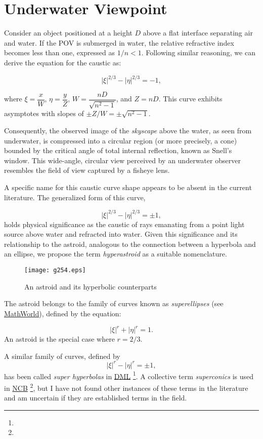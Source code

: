 \documentclass[twocolumn]{article}
\begin{document}
\section{Underwater Viewpoint}

Consider an object positioned at a height $D$ above a flat interface separating air and water. If the  POV is submerged in water, the relative refractive index becomes less than one, expressed as $1/n < 1$. Following similar reasoning, we can derive the equation for the caustic as:

$$ \left| \xi \right|^{2/3} - \left| \eta \right|^{2/3} = -1, $$

where $\xi = \dfrac{x}{W}$, $\eta = \dfrac{y}{Z}$, $W = \dfrac{nD}{\sqrt{n^2-1}}$, and $Z = nD$. This curve exhibits asymptotes with slopes of $\pm Z/W = \pm \sqrt{n^2-1}$.

Consequently, the observed image of the \emph{skyscape} above the water, as seen from underwater, is compressed into a circular region (or more precisely, a cone) bounded by the critical angle of total internal reflection, known as Snell's window. This wide-angle, circular view perceived by an underwater observer resembles the field of view captured by a fisheye lens.

A specific name for this caustic curve shape appears to be absent in the current literature. The generalized form of this curve,

$$ \left| \xi \right|^{2/3} - \left| \eta \right|^{2/3} = \pm1, $$
%
holds physical significance as the caustic of rays emanating from a point light source above water and refracted into water. Given this significance and its relationship to the astroid, analogous to the connection between a hyperbola and an ellipse, we propose the term \emph{hyperastroid} as a suitable nomenclature.

\begin{figure}[h]
	\centering
	\texttt{[image: g254.eps]}
	\caption{An astroid and its hyperbolic counterparts}
	\label{fig:caustic}
\end{figure}

The astroid belongs to the family of curves known as \emph{superellipses} (see \href{https://mathworld.wolfram.com/Astroid.html}{MathWorld}), defined by the equation:

$$ \left| \xi \right|^{r} + \left| \eta \right|^{r} = 1. $$
%
An astroid is the special case where $r=2/3$. 

A similar family of curves, defined by
$$
\left| \xi \right|^{r} - \left| \eta \right|^{r} = \pm 1,
$$
%
has been called \emph{super hyperbolas} in \href{http://dynamicmathematicslearning.com/super-ellipse.html}{DML} \footnote{}. A collective term \emph{superconics} is used in \href{https://old.nationalcurvebank.org/superconicncb/superconicncb.htm}{NCB} \footnote{}, but I have not found other instances of these terms in the literature and am uncertain if they are established terms in the field.
\end{document}
